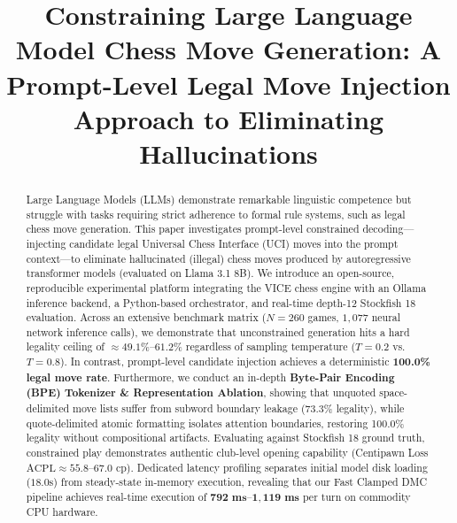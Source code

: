 \documentclass[conference]{IEEEtran}
\begin{document}
\title{Constraining Large Language Model Chess Move Generation: A Prompt-Level Legal Move Injection Approach to Eliminating Hallucinations}

\author{
}

\maketitle

\begin{abstract}
Large Language Models (LLMs) demonstrate remarkable linguistic competence but struggle with tasks requiring strict adherence to formal rule systems, such as legal chess move generation. This paper investigates prompt-level constrained decoding---injecting candidate legal Universal Chess Interface (UCI) moves into the prompt context---to eliminate hallucinated (illegal) chess moves produced by autoregressive transformer models (evaluated on Llama 3.1 8B). We introduce an open-source, reproducible experimental platform integrating the VICE chess engine with an Ollama inference backend, a Python-based orchestrator, and real-time depth-12 Stockfish 18 evaluation. Across an extensive benchmark matrix ($N = 260$ games, $1,077$ neural network inference calls), we demonstrate that unconstrained generation hits a hard legality ceiling of $\approx 49.1\%$--$61.2\%$ regardless of sampling temperature ($T=0.2$ vs. $T=0.8$). In contrast, prompt-level candidate injection achieves a deterministic \textbf{100.0\% legal move rate}. Furthermore, we conduct an in-depth \textbf{Byte-Pair Encoding (BPE) Tokenizer \& Representation Ablation}, showing that unquoted space-delimited move lists suffer from subword boundary leakage (73.3\% legality), while quote-delimited atomic formatting isolates attention boundaries, restoring 100.0\% legality without compositional artifacts. Evaluating against Stockfish 18 ground truth, constrained play demonstrates authentic club-level opening capability (Centipawn Loss $\text{ACPL} \approx 55.8$--$67.0\text{ cp}$). Dedicated latency profiling separates initial model disk loading ($18.0\text{s}$) from steady-state in-memory execution, revealing that our Fast Clamped DMC pipeline achieves real-time execution of $\mathbf{792\text{ ms} \text{--} 1,119\text{ ms}}$ per turn on commodity CPU hardware.
\end{abstract}
\end{document}
